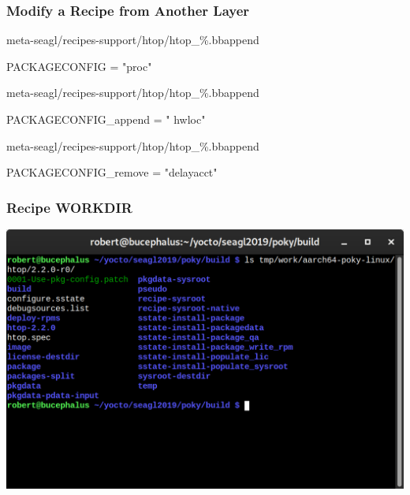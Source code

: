 \documentclass[aspectratio=169]{beamer}
\begin{document}
\begin{frame}[fragile]
\frametitle{Modify a Recipe from Another Layer}
\begin{block}{meta-seagl/recipes-support/htop/htop\_\%.bbappend}
\begin{semiverbatim}
PACKAGECONFIG = "proc"
\end{semiverbatim}
\end{block}
\begin{block}{meta-seagl/recipes-support/htop/htop\_\%.bbappend}
\begin{semiverbatim}
PACKAGECONFIG\_append = " hwloc"
\end{semiverbatim}
\end{block}
\begin{block}{meta-seagl/recipes-support/htop/htop\_\%.bbappend}
\begin{semiverbatim}
PACKAGECONFIG\_remove = "delayacct"
\end{semiverbatim}
\end{block}
\end{frame}

\begin{frame}
\frametitle{Recipe WORKDIR}
\begin{center}
	\includegraphics[width=\textwidth,height=0.9\textheight,keepaspectratio]{images/htop-workdir.png}
\end{center}
\end{frame}
\end{document}
